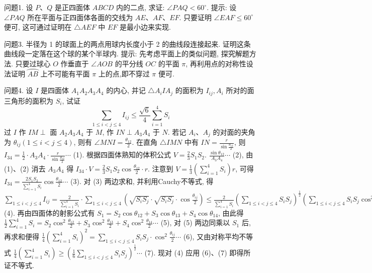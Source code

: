 
问题1. 设 $P 、 Q$ 是正四面体 $A B C D$ 内的二点, 求证: $\angle P A Q<60^{\circ}$.
提示: 设 $\angle P A Q$ 所在平面与正四面体各面的交线为 $A E 、 A F 、 E F$. 只要证明 $\angle E A F \leqslant 60^{\circ}$ 便可, 这可通过证明在 $\triangle A E F$ 中 $E F$ 是最小边来实现.



问题3. 半径为 1 的球面上的两点用球内长度小于 2 的曲线段连接起来.
证明这条曲线段一定落在这个球的某个半球内.
提示: 先考虑平面上的类似问题, 探究解题方法.
只要过球心 $O$ 作垂直于 $\angle A O B$ 的平分线 $O C$ 的平面 $\pi$, 再利用点的对称性设法证明 $\overparen{A B}$ 上不可能有平面 $\pi$ 上的点,即不穿过 $\pi$ 便可.



问题4. 设 $I$ 是四面体 $A_1 A_2 A_3 A_4$ 的内心, 并记 $\triangle A_i I A_j$ 的面积为 $I_{i j}, A_i$ 所对的面三角形的面积为 $S_i$, 试证
$$
\sum_{1 \leqslant i<j \leqslant 4} I_{i j} \leqslant \frac{\sqrt{6}}{4} \sum_{i=1}^4 S_i
$$
过 $I$ 作 $I M \perp$ 面 $A_2 A_3 A_4$ 于 $M$, 作 $I N \perp A_3 A_4$ 于 $N$. 若记 $A_i 、 A_j$ 的对面的夹角为 $\theta_{i j}(1 \leqslant i<j \leqslant 4)$, 则有 $\angle M N I=\frac{\theta_{12}}{2}$. 在直角 $\triangle I M N$ 中有 $I N= \frac{r}{\sin \frac{\theta_{12}}{2}}$, 则 $I_{34}=\frac{1}{2} \cdot A_3 A_4 \cdot \frac{r}{\sin \frac{\theta_{12}}{2}} \cdots$ (1). 根据四面体熟知的体积公式 $V=\frac{2}{3} S_1 S_2$. $\frac{\sin \theta_{12}}{A_3 A_4} \cdots$ (2), 由 (1)、(2) 消去 $A_3 A_4$ 得 $I_{34} \cdot V=\frac{2}{3} S_1 S_2 \cos \frac{\theta_{12}}{2} \cdot r$. 注意到 $V= \frac{1}{3}\left(\sum_{i=1}^4 S_i\right) r$, 可得 $I_{34}=\frac{2 S_1 S_2}{\sum_{i=1}^4 S_i} \cos \frac{\theta_{12}}{2} \cdots$ (3). 对 (3) 两边求和, 并利用Cauchy不等式, 得 $\sum_{1 \leqslant i<j \leqslant 4} I_{i j}=\frac{2}{\sum_{i=1}^4 S_i} \cdot \sum_{1 \leqslant i<j \leqslant 4}\left(\sqrt{S_i S_j} \cdot \sqrt{S_i S_j} \cdot \cos \frac{\theta_{i j}}{2}\right) \leqslant \frac{2}{\sum_{i=1}^4 S_i}\left(\sum_{1 \leqslant i<j \leqslant 4} S_i S_j\right)^{\frac{1}{2}} \left(\sum_{1 \leqslant i<j \leqslant 4} S_i S_j \cos ^2 \frac{\theta_{i j}}{2}\right)^{\frac{1}{2}} \cdots$ (4). 再由四面体的射影公式有 $S_1=S_2 \cos \theta_{12}+ S_3 \cos \theta_{13}+S_4 \cos \theta_{14}$, 由此得 $\frac{1}{2} \sum_{i=1}^4 S_i=S_2 \cos ^2 \frac{\theta_{12}}{2}+S_3 \cos ^2 \frac{\theta_{13}}{2}+ S_4 \cos ^2 \frac{\theta_{14}}{2} \cdots$ (5), 对 (5) 两边同乘以 $S_1$ 后, 再求和便得 $\frac{1}{4}\left(\sum_{i=1}^4 S_i\right)^2=\sum_{1 \leqslant i<j \leqslant 4} S_i S_j \cdot \cos ^2 \frac{\theta_{i j}}{2} \cdots$ (6), 又由对称平均不等式 $\frac{1}{4}\left(\sum_{i=1}^4 S_i\right) \geqslant\left(\frac{1}{6} \sum_{1 \leqslant i<j \leqslant 4} S_i S_j\right)^{\frac{1}{2}} \cdots$ (7). 现对 (4) 应用 (6)、(7) 即得所证不等式.



